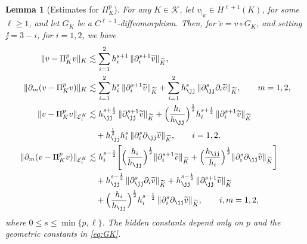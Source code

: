 \documentclass[a4paper,twoside,10pt]{article}
\newtheorem{lemma}[theorem]{Lemma}
\newcommand{\calE}{\mathcal{E}}
\newcommand{\calK}{\mathcal{K}}
\numberwithin{equation}{section}
\newcommand{\Kt}{\widetilde{K}}
\begin{document}
	\begin{lemma}[Estimates for $\Pi_K^p$]\label{lem:proj_estimates}
		For any $K \in \calK$, let $v_{|_K}\in H^{\ell+1}(K)$, for some $\ell\ge 1$, and let $G_K$ be a $C^{\ell+1}$-diffeomorphism. Then, for $\widetilde v= v\circ G_K$, 
        and setting $\jj=3-i$, for $i=1,2$,
        we have  
		\begin{align}
			\|v-\Pi_K^p v \|_{K}
			&\lesssim
			\sum_{i=1}^2 h_i^{s+1}\,
			\|\partial_i^{s+1}\widetilde v\|_{\Kt},
			\label{eq:proj_est_L2}
			\\
			\|\partial_m (v-\Pi_K^p v) \|_{K}
			&\lesssim
			\sum_{i=1}^2 h_i^{s}\,
			\|\partial_i^{s+1}\widetilde v\|_{\Kt}
			+
			\sum_{i=1}^2 h_{\jj}^{s}\,
			\|\partial_{\jj}^{s}\partial_i\widetilde v\|_{\Kt},
			\qquad m=1,2,
			\label{eq:proj_est_H1}
			\\
			\|v-\Pi_K^p v\|_{\calE_i^K}
			&\lesssim
			h_{\jj}^{s+\frac12}\,
			\|\partial_{\jj}^{s+1}\widetilde v\|_{\Kt}
			+
			\Big(\frac{h_i}{h_{\jj}}\Big)^{\frac12}
			h_i^{s+
			\frac12}\,
			\|\partial_i^{s+1}\widetilde v\|_{\Kt}
			\notag\\
			&\quad
			+
			h_{\jj}^{\frac12}h_i^s\,
			\|\partial_i^s\partial_{\jj}\widetilde v\|_{\Kt},
			\qquad i=1,2,
			\label{eq:proj_est_trace}
			\\
			\|\partial_m(v-\Pi_K^p v) \|_{\calE_i^K}
			&\lesssim
			h_i^{s-\frac12}
			\Bigg[
			\Big(\frac{h_i}{h_{\jj}}\Big)^{\frac12}
			\|\partial_i^{s+1}\widetilde v\|_{\Kt}
			+
			\Big(\frac{h_{\jj}}{h_i}\Big)^{\frac12}
			\|\partial_i^s\partial_{\jj}\widetilde v\|_{\Kt}
			\Bigg]
			\notag\\
			&\quad
			+
			h_{\jj}^{s-\frac12}\,
			\|\partial_{\jj}^{s}\partial_i\widetilde v\|_{\Kt}
			+
			h_{\jj}^{s-\frac12}\,
			\|\partial_{\jj}^{s+1}\widetilde v\|_{\Kt}
			\notag\\
			&\quad
			+
			\Big(\frac{h_i}{h_{\jj}}\Big)^{\frac12}
			h_i^{s-\frac12}\,
			\|\partial_i^s\partial_{\jj}\widetilde v\|_{\Kt},
			\qquad  i,m=1,2,
			\label{eq:proj_est_dtrace}
		\end{align}
		 where $0\leq s\leq \min\{p,\ell\}$.
		The hidden constants depend only on $p$ and the geometric constants in
		\eqref{eq:GK}.
	\end{lemma}

	
\end{document}
